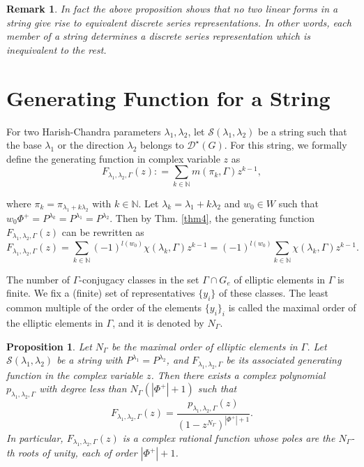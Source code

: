 \documentclass[11 pt]{amsart}
\newcommand{\N}{{\mathbb N}}
\newtheorem{proposition}[theorem]{Proposition}
\theoremstyle{definition}
\newtheorem{remark}{Remark}[section]
\numberwithin{equation}{section}
\begin{document}
\begin{remark}
\textit{ In fact the above proposition shows that no two linear forms in a string give rise to equivalent discrete series representations. In other words, each member of a string determines a discrete series representation which is inequivalent to the rest.}
\end{remark}

\section{Generating Function for a String}\label{sec-3}

\noindent For two Harish-Chandra parameters $\lambda_1, \lambda_2$, let $\mathcal{S}( \lambda_1 , \lambda_2)$ be a string such that the base $\lambda_1$ or the direction $\lambda_2$ belongs to $\mathcal{D}^{\star}(G)$. For this string, we formally define the generating function in complex variable $z$ as 
$$F_{\lambda_1, \lambda_2, \Gamma} (z) : = \sum\limits_{k \in \N} m(\pi_k , \Gamma) z^{k-1},$$

\noindent where $\pi_k = \pi_{\lambda_1 + k \lambda_2 }$ with $k \in \N$. Let $\lambda_k = \lambda_1 + k \lambda_2$ and $w_0 \in W$ such that $w_0 \Phi^+ = P^{\lambda_k}=P^{\lambda_1}=P^{\lambda_2}$. Then by Thm. \ref{thm4}, the generating function $F_{\lambda_1, \lambda_2, \Gamma} (z)$ can be rewritten as $$ F_{\lambda_1, \lambda_2, \Gamma}(z) = \sum\limits_{k \in \N} (-1)^{l(w_0)} \chi(\lambda_k, \Gamma) z ^{k-1} = (-1)^{l(w_0)} \sum\limits_{k \in \N} \chi(\lambda_k, \Gamma) z^{k-1}.$$

\noindent The number of $\Gamma$-conjugacy classes in the set $\Gamma \cap G_e$ of elliptic elements in $\Gamma$ is finite. We fix a (finite) set of representatives $\{y_i\}$ of these classes. The least common multiple of the order of the elements $\{y_i\}_i$ is called the maximal order of the elliptic elements in $\Gamma$, and it is denoted by $N_{\Gamma}$.

\begin{proposition}\label{propgen}
\textit{Let $N_{\Gamma}$ be the maximal order of elliptic elements in $\Gamma$. Let $\mathcal{S}(\lambda_1, \lambda_2)$ be a string with $P^{\lambda_1}=P^{\lambda_2}$, and $F_{\lambda_1, \lambda_2, \Gamma}$ be its associated generating function in the complex variable $z$. Then there exists a complex polynomial $p_{\lambda_1, \lambda_2, \Gamma}$ with degree less than $N_{\Gamma} ( |\Phi^+| +1)$ such that 
$$ F_{\lambda_1, \lambda_2, \Gamma}(z) = \frac{p_{\lambda_1, \lambda_2, \Gamma}(z)}{(1 -z^{N_{\Gamma}})^{|\Phi^+| +1}}.$$ 
In particular, $F_{\lambda_1, \lambda_2, \Gamma}(z)$ is a complex rational function whose poles are the $N_{\Gamma}$-th roots of unity, each of order $|\Phi^+| +1$.} 
\end{proposition}
\end{document}
